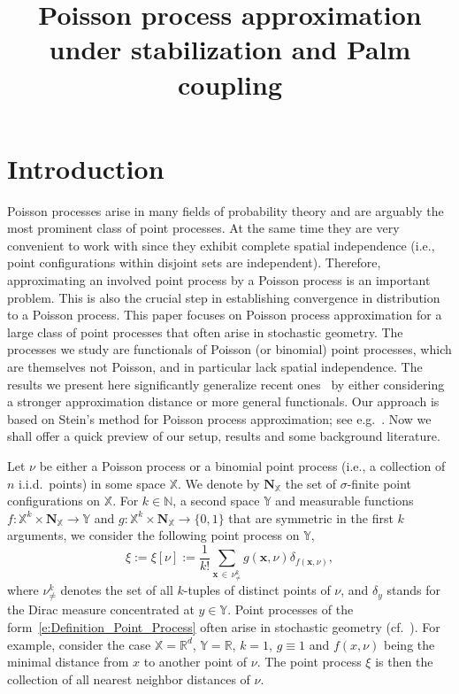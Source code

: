 \documentclass[AHL,Unicode,longabstracts]{cedram}
\title[Poisson approximation under stabilization]{Poisson process approximation under stabilization and Palm coupling}
\author[\initial{O.} \lastname{Bobrowski}]{\firstname{Omer} \lastname{Bobrowski}}
\author[\initial{M.} \lastname{Schulte}]{\firstname{Matthias} \lastname{Schulte}}
\author[\initial{D.} \lastname{Yogeshwaran}]{\firstname{D.} \lastname{Yogeshwaran}}
\newcommand*\bN{\mathbf{N}}
\newcommand{\bx}{\mathbf{x}}
\newcommand*\N{\mathbb{N}}
\newcommand*\R{\mathbb{R}}
\newcommand*\X{\mathbb{X}}
\newcommand*\Y{\mathbb{Y}}
\begin{document}
\maketitle


\section{Introduction}

Poisson processes arise in many fields of probability theory and are arguably the most prominent class of point processes. At the same time they are very convenient to work with since they exhibit complete spatial independence (i.e., point configurations within disjoint sets are independent). Therefore, approximating an involved point process by a Poisson process is an important problem. This is also the crucial step in establishing convergence in distribution to a Poisson process. This paper focuses on Poisson process approximation for a large class of point processes that often arise in stochastic geometry. The processes we study are functionals of Poisson (or binomial) point processes, which are themselves not Poisson, and in particular lack spatial independence. The results we present here significantly generalize recent ones~\cite{decreusefond_functional_2016,Otto2020} by either considering a stronger approximation distance or more general functionals. Our approach is based on Stein's method for Poisson process approximation; see e.g.~\cite{Barbour1988,Barbour1992,Barbour1992book,Chen2004,decreusefond_functional_2016, Xia2005}. Now we shall offer a quick preview of our setup, results and some background literature.


Let $\nu$ be either a Poisson process or a binomial point process (i.e., a collection of $n$ i.i.d.\ points) in some space $\X$. We denote by $\bN_{\X}$ the set of $\sigma$-finite point configurations on $\X$. For $k\in\N$, a second space $\Y$ and measurable functions $f: \X^k\times \bN_{\X}\to \Y$ and $g: \X^k\times \bN_{\X}\to \{0,1\}$ that are symmetric in the first $k$ arguments, we consider the following point process on $\Y$,
\begin{equation}\label{e:Definition_Point_Process}
\xi {:=} \xi[\nu] {:=} \frac{1}{k!}\sum_{\bx\,\in\,\nu^k_{\neq}} g(\bx,\nu) \delta_{f(\bx,\nu)},
\end{equation}
where $\nu^k_{\neq}$ denotes the set of all $k$-tuples of distinct points of $\nu$, and $\delta_y$ stands for the Dirac measure concentrated at $y\in\Y$. Point processes of the form~\eqref{e:Definition_Point_Process} often arise in stochastic geometry (cf.~\cite{Otto2020,PianoforteSchulte2021}). For example, consider the case $\X=\R^d$, $\Y=\R$, $k=1$, $g \equiv 1$ and $f(x,\nu)$ being the minimal distance from $x$ to another point of $\nu$. The point process $\xi$ is then the collection of all nearest neighbor distances of $\nu$.
\end{document}
